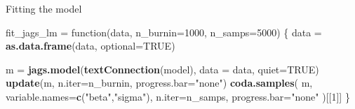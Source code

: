\documentclass[11pt,ignorenonframetext,]{beamer}
\newenvironment{Shaded}{}{}
\newcommand{\KeywordTok}[1]{\textcolor[rgb]{0.00,0.44,0.13}{\textbf{{#1}}}}
\newcommand{\DataTypeTok}[1]{\textcolor[rgb]{0.56,0.13,0.00}{{#1}}}
\newcommand{\DecValTok}[1]{\textcolor[rgb]{0.25,0.63,0.44}{{#1}}}
\newcommand{\StringTok}[1]{\textcolor[rgb]{0.25,0.44,0.63}{{#1}}}
\newcommand{\OtherTok}[1]{\textcolor[rgb]{0.00,0.44,0.13}{{#1}}}
\newcommand{\NormalTok}[1]{{#1}}
\let\oldShaded\Shaded
\let\endoldShaded\endShaded
\renewenvironment{Shaded}{\footnotesize\begin{spacing}{0.9}\oldShaded}{\endoldShaded\end{spacing}}
\begin{document}
\begin{frame}[fragile]{Fitting the model}

\begin{Shaded}
\begin{Highlighting}[]
\NormalTok{fit_jags_lm =}\StringTok{ }\NormalTok{function(data, }\DataTypeTok{n_burnin=}\DecValTok{1000}\NormalTok{, }\DataTypeTok{n_samps=}\DecValTok{5000}\NormalTok{)}
\NormalTok{\{}
  \NormalTok{data =}\StringTok{ }\KeywordTok{as.data.frame}\NormalTok{(data, }\DataTypeTok{optional=}\OtherTok{TRUE}\NormalTok{)}

  \NormalTok{m =}\StringTok{ }\KeywordTok{jags.model}\NormalTok{(}\KeywordTok{textConnection}\NormalTok{(model), }\DataTypeTok{data =} \NormalTok{data, }\DataTypeTok{quiet=}\OtherTok{TRUE}\NormalTok{)}
  \KeywordTok{update}\NormalTok{(m, }\DataTypeTok{n.iter=}\NormalTok{n_burnin, }\DataTypeTok{progress.bar=}\StringTok{"none"}\NormalTok{)}
  \KeywordTok{coda.samples}\NormalTok{(}
    \NormalTok{m, }\DataTypeTok{variable.names=}\KeywordTok{c}\NormalTok{(}\StringTok{"beta"}\NormalTok{,}\StringTok{"sigma"}\NormalTok{), }
    \DataTypeTok{n.iter=}\NormalTok{n_samps, }\DataTypeTok{progress.bar=}\StringTok{"none"}
  \NormalTok{)[[}\DecValTok{1}\NormalTok{]]}
\NormalTok{\}}
\end{Highlighting}
\end{Shaded}

\end{frame}
\end{document}
